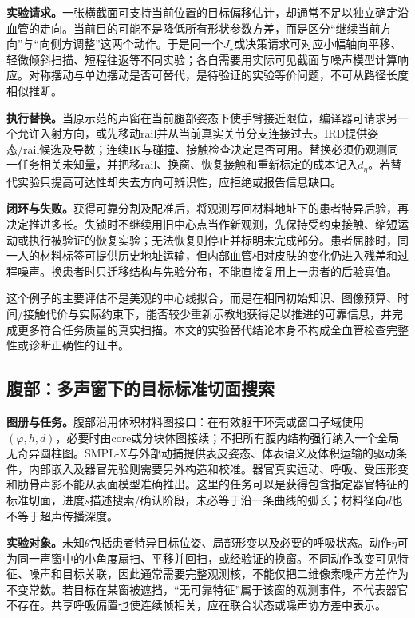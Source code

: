 \documentclass[11pt,a4paper]{article}
\numberwithin{equation}{section}
\theoremstyle{definition}
\begin{document}
\textbf{实验请求。}一张横截面可支持当前位置的目标偏移估计，却通常不足以独立确定沿血管的走向。当前目的可能不是降低所有形状参数方差，而是区分``继续当前方向''与``向侧方调整''这两个动作。于是同一个$J_\star$或决策请求可对应小幅轴向平移、轻微倾斜扫描、短程往返等不同实验；各自需要用实际可见截面与噪声模型计算响应。对称摆动与单边摆动是否可替代，是待验证的实验等价问题，不可从路径长度相似推断。

\textbf{执行替换。}当原示范的声窗在当前腿部姿态下使手臂接近限位，编译器可请求另一个允许入射方向，或先移动rail并从当前真实关节分支连接过去。IRD提供姿态/rail候选及导数；连续IK与碰撞、接触检查决定是否可用。替换必须仍观测同一任务相关未知量，并把移rail、换窗、恢复接触和重新标定的成本记入$d_\eta$。若替代实验只提高可达性却失去方向可辨识性，应拒绝或报告信息缺口。

\textbf{闭环与失败。}获得可靠分割及配准后，将观测写回材料地址下的患者特异后验，再决定推进多长。失锁时不继续用旧中心点当作新观测，先保持受约束接触、缩短运动或执行被验证的恢复实验；无法恢复则停止并标明未完成部分。患者屈膝时，同一人的材料标签可提供历史地址运输，但内部血管相对皮肤的变化仍进入残差和过程噪声。换患者时只迁移结构与先验分布，不能直接复用上一患者的后验真值。

这个例子的主要评估不是美观的中心线拟合，而是在相同初始知识、图像预算、时间/接触代价与实际约束下，能否较少重新示教地获得足以推进的可靠信息，并完成更多符合任务质量的真实扫描。本文的实验替代结论本身不构成全血管检查完整性或诊断正确性的证书。

\subsection{腹部：多声窗下的目标标准切面搜索}

\textbf{图册与任务。}腹部沿用体积材料图接口：在有效躯干环壳或窗口子域使用$(\varphi,h,d)$，必要时由core或分块体图接续；不把所有腹内结构强行纳入一个全局无奇异圆柱图。SMPL-X与外部动捕提供表皮姿态、体表语义及体积运输的驱动条件\cite{smplx2019}，内部嵌入及器官先验则需要另外构造和校准。器官真实运动、呼吸、受压形变和肋骨声影不能从表面模型准确推出。这里的任务可以是获得包含指定器官特征的标准切面，进度$s$描述搜索/确认阶段，未必等于沿一条曲线的弧长；材料径向$d$也不等于超声传播深度。

\textbf{实验对象。}未知$\theta$包括患者特异目标位姿、局部形变以及必要的呼吸状态。动作$\eta$可为同一声窗中的小角度扇扫、平移并回扫，或经验证的换窗。不同动作改变可见特征、噪声和目标关联，因此通常需要完整观测核，不能仅把二维像素噪声方差作为不变常数。若目标在某窗被遮挡，``无可靠特征''属于该窗的观测事件，不代表器官不存在。共享呼吸偏置也使连续帧相关，应在联合状态或噪声协方差中表示。
\end{document}
